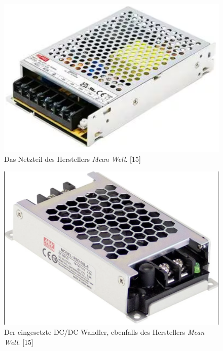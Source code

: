 \begin{figure}[H]
    \centering
    \includegraphics[scale=0.7]{98_images/controller_ps.PNG}
    \caption{Das Netzteil des Herstellers \textit{Mean Well}. [15]}
    \label{fig:controller_ps_hw}
\end{figure}

\begin{figure}[H]
    \centering
    \includegraphics[scale=0.25, trim={1mm 1mm 1mm 1mm}, clip]{98_images/mean_well_dc_dc_converter.PNG}  
    \caption{Der eingesetzte DC/DC-Wandler, ebenfalls des Herstellers \textit{Mean Well}. [15]}
    \label{fig:dc_dc_wandler_hw}
\end{figure}


